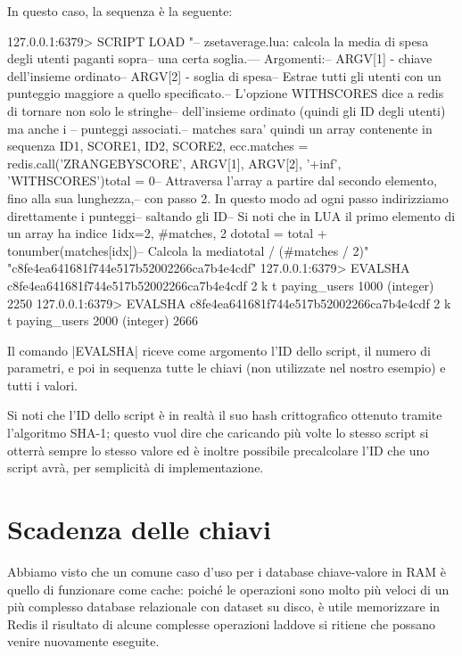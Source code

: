 In questo caso, la sequenza è la seguente:

\begin{commentedsource}[style=redis]
127.0.0.1:6379> SCRIPT LOAD "-- zsetaverage.lua: calcola la media di spesa degli utenti paganti sopra\n-- una certa soglia.\n--\n-- Argomenti:\n--     ARGV[1] - chiave dell'insieme ordinato\n--     ARGV[2] - soglia di spesa\n\n-- Estrae tutti gli utenti con un punteggio maggiore a quello specificato.\n-- L'opzione WITHSCORES dice a redis di tornare non solo le stringhe\n-- dell'insieme ordinato (quindi gli ID degli utenti) ma anche i \n-- punteggi associati.\n-- matches sara' quindi un array contenente in sequenza ID1, SCORE1, ID2, SCORE2, ecc.\nlocal matches = redis.call('ZRANGEBYSCORE', ARGV[1], ARGV[2], '+inf', 'WITHSCORES')\n\nlocal total = 0\n\n-- Attraversa l'array a partire dal secondo elemento, fino alla sua lunghezza,\n-- con passo 2. In questo modo ad ogni passo indirizziamo direttamente i punteggi\n-- saltando gli ID\n-- Si noti che in LUA il primo elemento di un array ha indice 1\nfor idx=2, #matches, 2 do\n    total = total + tonumber(matches[idx])\nend\n\n-- Calcola la media\nreturn total / (#matches / 2)\n"
"c8fe4ea641681f744e517b52002266ca7b4e4cdf"
127.0.0.1:6379> EVALSHA c8fe4ea641681f744e517b52002266ca7b4e4cdf 2 k t paying_users 1000
(integer) 2250
127.0.0.1:6379> EVALSHA c8fe4ea641681f744e517b52002266ca7b4e4cdf 2 k t paying_users 2000
(integer) 2666
\end{commentedsource}

Il comando \cverb|EVALSHA| riceve come argomento l'ID dello script, il numero di parametri, e poi
in sequenza tutte le chiavi (non utilizzate nel nostro esempio) e tutti i valori. 

Si noti che l'ID dello script è in realtà il suo hash crittografico ottenuto tramite l'algoritmo
SHA-1; questo vuol dire che caricando più volte lo stesso script si otterrà sempre lo stesso valore
ed è inoltre possibile precalcolare l'ID che uno script avrà, per semplicità di implementazione.

\section{Scadenza delle chiavi}

Abbiamo visto che un comune caso d'uso per i database chiave-valore in RAM è quello di funzionare
come cache: poiché le operazioni sono molto più veloci di un più complesso database relazionale con
dataset su disco, è utile memorizzare in Redis il risultato di alcune complesse operazioni laddove
si ritiene che possano venire nuovamente eseguite. 

